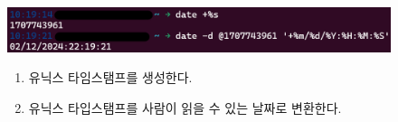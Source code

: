 \begin{figure}[h]
    \includegraphics[width=15cm]{resource/3-date-example.png}
    \begin{enumerate}
        \item 유닉스 타임스탬프를 생성한다.
        \item 유닉스 타입스탬프를 사람이 읽을 수 있는 날짜로 변환한다.
    \end{enumerate}
\end{figure}